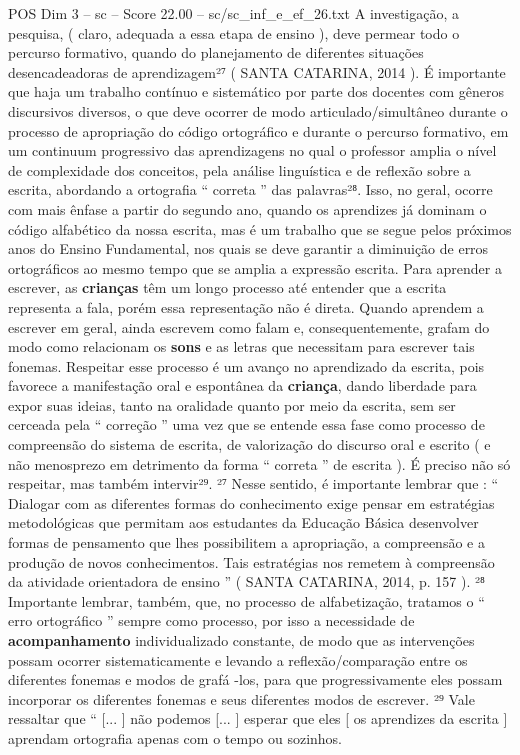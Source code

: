\begin{textsample}{POS Dim 3 – sc – Score 22.00 – sc/sc\_inf\_e\_ef\_26.txt}
A investigação, a pesquisa, ( claro, adequada a essa etapa de ensino ), deve permear todo o percurso formativo, quando do planejamento de diferentes situações desencadeadoras de aprendizagem²⁷ ( SANTA CATARINA, 2014 ).
É importante que haja um trabalho contínuo e sistemático por parte dos docentes com gêneros discursivos diversos, o que deve ocorrer de modo articulado/simultâneo durante o processo de apropriação do código ortográfico e durante o percurso formativo, em um continuum progressivo das aprendizagens no qual o professor amplia o nível de complexidade dos conceitos, pela análise linguística e de reflexão sobre a escrita, abordando a ortografia “ correta ” das palavras²⁸.
Isso, no geral, ocorre com mais ênfase a partir do segundo ano, quando os aprendizes já dominam o código alfabético da nossa escrita, mas é um trabalho que se segue pelos próximos anos do Ensino Fundamental, nos quais se deve garantir a diminuição de erros ortográficos ao mesmo tempo que se amplia a expressão escrita.
Para aprender a escrever, as \textbf{crianças} têm um longo processo até entender que a escrita representa a fala, porém essa representação não é direta.
Quando aprendem a escrever em geral, ainda escrevem como falam e, consequentemente, grafam do modo como relacionam os \textbf{sons} e as letras que necessitam para escrever tais fonemas.
Respeitar esse processo é um avanço no aprendizado da escrita, pois favorece a manifestação oral e espontânea da \textbf{criança}, dando liberdade para expor suas ideias, tanto na oralidade quanto por meio da escrita, sem ser cerceada pela “ correção ” uma vez que se entende essa fase como processo de compreensão do sistema de escrita, de valorização do discurso oral e escrito ( e não menosprezo em detrimento da forma “ correta ” de escrita ).
É preciso não só respeitar, mas também intervir²⁹. ²⁷ Nesse sentido, é importante lembrar que : “ Dialogar com as diferentes formas do conhecimento exige pensar em estratégias metodológicas que permitam aos estudantes da Educação Básica desenvolver formas de pensamento que lhes possibilitem a apropriação, a compreensão e a produção de novos conhecimentos.
Tais estratégias nos remetem à compreensão da atividade orientadora de ensino ” ( SANTA CATARINA, 2014, p. 157 ). ²⁸ Importante lembrar, também, que, no processo de alfabetização, tratamos o “ erro ortográfico ” sempre como processo, por isso a necessidade de \textbf{acompanhamento} individualizado constante, de modo que as intervenções possam ocorrer sistematicamente e levando a reflexão/comparação entre os diferentes fonemas e modos de grafá -los, para que progressivamente eles possam incorporar os diferentes fonemas e seus diferentes modos de escrever. ²⁹ Vale ressaltar que “ [... ] não podemos [... ] esperar que eles [ os aprendizes da escrita ] aprendam ortografia apenas com o tempo ou sozinhos.

\end{textsample}
